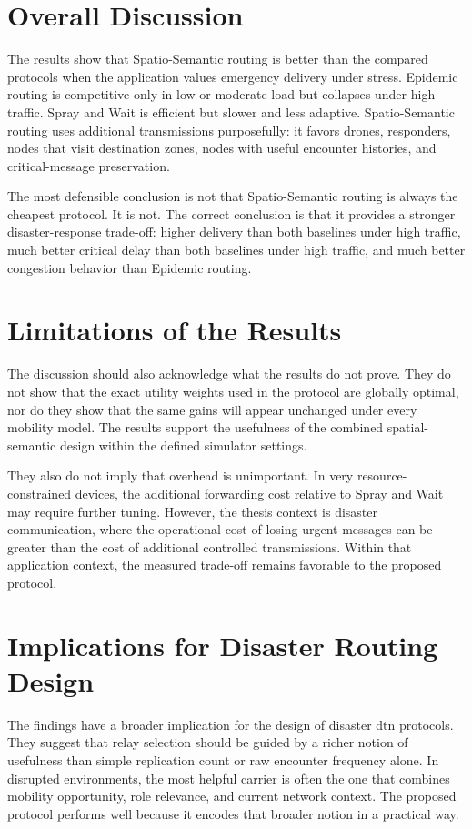 \section{Overall Discussion}
The results show that Spatio-Semantic routing is better than the compared protocols when the application values emergency delivery under stress. Epidemic routing is competitive only in low or moderate load but collapses under high traffic. Spray and Wait is efficient but slower and less adaptive. Spatio-Semantic routing uses additional transmissions purposefully: it favors drones, responders, nodes that visit destination zones, nodes with useful encounter histories, and critical-message preservation.

The most defensible conclusion is not that Spatio-Semantic routing is always the cheapest protocol. It is not. The correct conclusion is that it provides a stronger disaster-response trade-off: higher delivery than both baselines under high traffic, much better critical delay than both baselines under high traffic, and much better congestion behavior than Epidemic routing.

\section{Limitations of the Results}
The discussion should also acknowledge what the results do not prove. They do not show that the exact utility weights used in the protocol are globally optimal, nor do they show that the same gains will appear unchanged under every mobility model. The results support the usefulness of the combined spatial-semantic design within the defined simulator settings.

They also do not imply that overhead is unimportant. In very resource-constrained devices, the additional forwarding cost relative to Spray and Wait may require further tuning. However, the thesis context is disaster communication, where the operational cost of losing urgent messages can be greater than the cost of additional controlled transmissions. Within that application context, the measured trade-off remains favorable to the proposed protocol.

\section{Implications for Disaster Routing Design}
The findings have a broader implication for the design of disaster \ac{dtn} protocols. They suggest that relay selection should be guided by a richer notion of usefulness than simple replication count or raw encounter frequency alone. In disrupted environments, the most helpful carrier is often the one that combines mobility opportunity, role relevance, and current network context. The proposed protocol performs well because it encodes that broader notion in a practical way.

